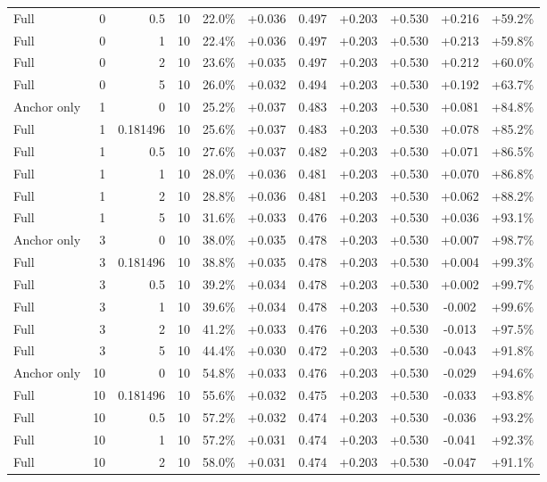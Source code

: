 \begin{table}[htbp]
\begin{tabular}{lrrrccccccc}
Full & 0 & 0.5 & 10 & 22.0\% & +0.036 & 0.497 & +0.203 & +0.530 & +0.216 & +59.2\% \\
Full & 0 & 1 & 10 & 22.4\% & +0.036 & 0.497 & +0.203 & +0.530 & +0.213 & +59.8\% \\
Full & 0 & 2 & 10 & 23.6\% & +0.035 & 0.497 & +0.203 & +0.530 & +0.212 & +60.0\% \\
Full & 0 & 5 & 10 & 26.0\% & +0.032 & 0.494 & +0.203 & +0.530 & +0.192 & +63.7\% \\
Anchor only & 1 & 0 & 10 & 25.2\% & +0.037 & 0.483 & +0.203 & +0.530 & +0.081 & +84.8\% \\
Full & 1 & 0.181496 & 10 & 25.6\% & +0.037 & 0.483 & +0.203 & +0.530 & +0.078 & +85.2\% \\
Full & 1 & 0.5 & 10 & 27.6\% & +0.037 & 0.482 & +0.203 & +0.530 & +0.071 & +86.5\% \\
Full & 1 & 1 & 10 & 28.0\% & +0.036 & 0.481 & +0.203 & +0.530 & +0.070 & +86.8\% \\
Full & 1 & 2 & 10 & 28.8\% & +0.036 & 0.481 & +0.203 & +0.530 & +0.062 & +88.2\% \\
Full & 1 & 5 & 10 & 31.6\% & +0.033 & 0.476 & +0.203 & +0.530 & +0.036 & +93.1\% \\
Anchor only & 3 & 0 & 10 & 38.0\% & +0.035 & 0.478 & +0.203 & +0.530 & +0.007 & +98.7\% \\
Full & 3 & 0.181496 & 10 & 38.8\% & +0.035 & 0.478 & +0.203 & +0.530 & +0.004 & +99.3\% \\
Full & 3 & 0.5 & 10 & 39.2\% & +0.034 & 0.478 & +0.203 & +0.530 & +0.002 & +99.7\% \\
Full & 3 & 1 & 10 & 39.6\% & +0.034 & 0.478 & +0.203 & +0.530 & -0.002 & +99.6\% \\
Full & 3 & 2 & 10 & 41.2\% & +0.033 & 0.476 & +0.203 & +0.530 & -0.013 & +97.5\% \\
Full & 3 & 5 & 10 & 44.4\% & +0.030 & 0.472 & +0.203 & +0.530 & -0.043 & +91.8\% \\
Anchor only & 10 & 0 & 10 & 54.8\% & +0.033 & 0.476 & +0.203 & +0.530 & -0.029 & +94.6\% \\
Full & 10 & 0.181496 & 10 & 55.6\% & +0.032 & 0.475 & +0.203 & +0.530 & -0.033 & +93.8\% \\
Full & 10 & 0.5 & 10 & 57.2\% & +0.032 & 0.474 & +0.203 & +0.530 & -0.036 & +93.2\% \\
Full & 10 & 1 & 10 & 57.2\% & +0.031 & 0.474 & +0.203 & +0.530 & -0.041 & +92.3\% \\
Full & 10 & 2 & 10 & 58.0\% & +0.031 & 0.474 & +0.203 & +0.530 & -0.047 & +91.1\% \\

\end{tabular}
\end{table}
